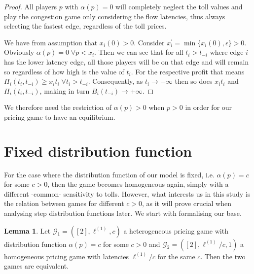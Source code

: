 \documentclass[10pt,a4paper]{book}
\newcommand{\Gm}{\mathcal{G}}
\theoremstyle{definition}
\newtheorem{lemma}[definition]{Lemma}
\theoremstyle{comment}
\begin{document}
\begin{proof}
	All players $p$ with $\alpha(p) = 0$ will completely neglect the toll values and play the congestion game only considering the flow latencies, thus always selecting the fastest edge, regardless of the toll prices.

	We have from assumption that $x_i(0) > 0$.
	Consider $x_i^\prime = \min\{x_i(0), \epsilon\} > 0$.
	Obviously $\alpha(p) = 0 \; \forall p < x_i$.
	Then we can see that for all $t_i > t_{-i}$ where edge $i$ has the lower latency edge, all those players will be on that edge and will remain so regardless of how high is the value of $t_i$.
	For the respective profit that means $\Pi_i(t_i, t_{-i}) \ge x_i t_i \; \forall t_i > t_{-i}$.
	Consequently, as $t_i \rightarrow +\infty$ then so does $x_i t_i$ and $\Pi_i(t_i, t_{-i})$, making in turn $B_i(t_{-i}) \rightarrow +\infty$.
\end{proof}
We therefore need the restriction of $\alpha(p) > 0$ when $p > 0$ in order for our pricing game to have an equilibrium.

\section{Fixed distribution function}

For the case where the distribution function of our model is fixed, i.e. $\alpha(p) = c$ for some $c > 0$, then the game becomes homogeneous again, simply with a different -common- sensitivity to tolls.
However, what interests us in this study is the relation between games for different $c > 0$, as it will prove crucial when analysing step distribution functions later.
We start with formalising our base.

\begin{lemma}
	\label{lemma:a_fixed_base}
	Let $\Gm_1 = ([2], \ell^{(1)}, c)$ a heterogeneous pricing game with distribution function $\alpha(p) = c$ for some $c > 0$ and $\Gm_2 = ([2], \ell^{(1)} / c, 1)$ a homogeneous pricing game with latencies $\ell^{(1)} / c$ for the same $c$.
	Then the two games are equivalent.
\end{lemma}
\end{document}
